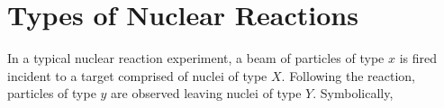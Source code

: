\documentclass{subfiles}
\begin{document}
	\section{Types of Nuclear Reactions}
		In a typical nuclear reaction experiment, a beam of particles of type \(x\) is fired incident to a target comprised of nuclei of type \(X\). Following the reaction, particles of type \(y\) are observed leaving nuclei of type \(Y\). Symbolically,
\end{document}
